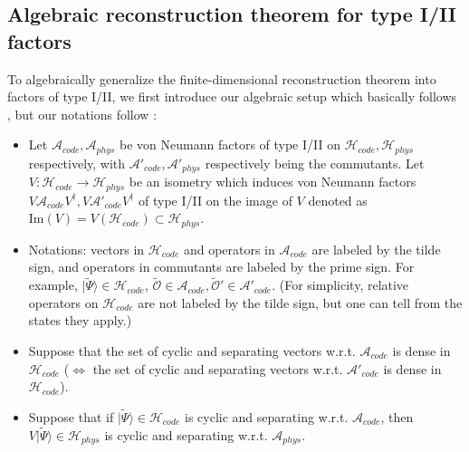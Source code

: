 \documentclass[a4paper,11pt]{article}
\newcommand{\ket}[1]{| #1 \rangle } %
\renewcommand{\=}[1]{\stackrel{#1}{=}} %
\newcommand{\im}{\text{Im}}
\def\A{\mathcal{A}}
\def\O{\mathcal{O}}
\def\H{\mathcal{H}}
\begin{document}
\subsection{Algebraic reconstruction theorem for type I/II factors}\label{sec:Algrec}




















To algebraically generalize the finite-dimensional reconstruction theorem into factors of type I/II, we first introduce our algebraic setup which basically follows \cite{Kang:2018xqy,Kang:2019dfi}, but our notations follow \cite{Harlow:2016vwg}:
\begin{itemize}
	\item Let $\A_{code},\A_{phys}$ be von Neumann factors of type I/II on $\H_{code},\H_{phys}$ respectively, with $\A'_{code},\A'_{phys}$ respectively being the commutants. Let $V: \H_{code}\rightarrow \H_{phys}$ be an isometry which induces von Neumann factors $V\A_{code}V^\dagger,V\A'_{code}V^\dagger$ of type I/II on the image of $V$ denoted as $\im(V)=V(\H_{code})\subset \H_{phys}$.
	
	
	\item Notations: vectors in $\H_{code}$ and operators in $\A_{code}$ are labeled by the tilde sign, and operators in commutants are labeled by the prime sign. For example, $\ket{\widetilde{\Psi}}\in\H_{code}$, $\widetilde{\O}\in \A_{code},\widetilde{\O}'\in\A'_{code}$. (For simplicity, relative operators on $\H_{code}$ are not labeled by the tilde sign, but one can tell from the states they apply.)
	
	
	\item Suppose that the set of cyclic and separating vectors w.r.t. $\A_{code}$ is dense in $\H_{code}$ ($\Leftrightarrow$ the set of cyclic and separating vectors w.r.t. $\A'_{code}$ is dense in $\H_{code}$).
	
	
	\item Suppose that if $\ket{\widetilde{\Psi}}\in\H_{code}$ is cyclic and separating w.r.t. $\A_{code}$, then $V\ket{\widetilde{\Psi}}\in\H_{phys}$ is cyclic and separating w.r.t. $\A_{phys}$.
	
	
	
\end{itemize}
\end{document}
